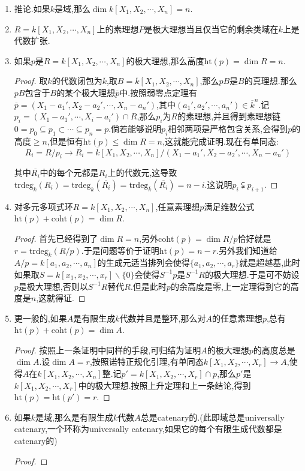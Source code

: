 \begin{enumerate}
	\item 推论.如果$k$是域,那么$\dim k[X_1,X_2,\cdots,X_n]=n$.
	\item $R=k[X_1,X_2,\cdots,X_n]$上的素理想$P$是极大理想当且仅当它的剩余类域在$k$上是代数扩张.
	\item 如果$p$是$R=k[X_1,X_2,\cdots,X_n]$的极大理想,那么高度$\mathrm{ht}(p)=\dim R=n$.
	\begin{proof}
		
		取$k$的代数闭包为$\overline{k}$,取$B=\overline{k}[X_1,X_2,\cdots,X_n]$,那么$pB$是$B$的真理想.那么$pB$包含于$B$的某个极大理想$\overline{p}$中.按照弱零点定理有$\overline{p}=(X_1-a_1',X_2-a_2',\cdots,X_n-a_n')$,其中$(a_1',a_2',\cdots,a_n')\in\overline{k}^n$.记$p_i=(X_1-a_1',\cdots,X_i-a_i')\cap R$,那么$p_i$为$R$的素理想,并且得到素理想链$0=p_0\subseteq p_1\subset\cdots\subseteq p_n=p$.倘若能够说明$p_i$相邻两项是严格包含关系,会得到$p$的高度$\ge n$,但是恒有$\mathrm{ht}(p)\le\dim R=n$,这就能完成证明.现在有单同态:
		$$R_i=R/p_i\to\overline{R_i}=\overline{k}[X_1,X_2,\cdots,X_n]/(X_1-a_1',X_2-a_2',\cdots,X_n-a_n')$$
		
		其中$\overline{R_i}$中的每个元都是$R_i$上的代数元,这导致$\mathrm{trdeg}_k(R_i)=\mathrm{trdeg}_k(\overline{R_i})=\mathrm{trdeg}_{\overline{k}}(\overline{R_i})=n-i$.这说明$p_i\subsetneqq p_{i+1}$.
	\end{proof}
	\item 对多元多项式环$R=k[X_1,X_2,\cdots,X_n]$,任意素理想$p$满足维数公式$\mathrm{ht}(p)+\mathrm{coht}(p)=\dim R$.
	\begin{proof}
		
		首先已经得到了$\dim R=n$,另外$\mathrm{coht}(p)=\dim R/p$恰好就是$r=\mathrm{trdeg}_k(R/p)$.于是问题等价于证明$\mathrm{ht}(p)=n-r$.另外我们知道给$A/p=k[a_1,a_2,\cdots,a_n]$的生成元适当排列会使得$\{a_1,a_2,\cdots,a_r\}$就是超越基,此时如果取$S=k[x_1,x_2,\cdots,x_r]\backslash\{0\}$会使得$S^{-1}p$是$S^{-1}R$的极大理想.于是可不妨设$p$是极大理想,否则以$S^{-1}R$替代$R$.但是此时$p$的余高度是零,上一定理得到它的高度是$n$,这就得证.
	\end{proof}
	\item 更一般的,如果$A$是有限生成$k$代数并且是整环,那么对$A$的任意素理想$p$,总有$\mathrm{ht}(p)+\mathrm{coht}(p)=\dim A$.
	\begin{proof}
		
		按照上一条证明中同样的手段,可归结为证明$A$的极大理想$p$的高度总是$\dim A$.设$\dim A=r$,按照诺特正规化引理,有单同态$k[X_1,X_2,\cdots,X_r]\to A$,使得$A$在$k[X_1,X_2,\cdots,X_n]$整.记$p'=k[X_1,X_2,\cdots,X_r]\cap p$,那么$p'$是$k[X_1,X_2,\cdots,X_r]$中的极大理想.按照上升定理和上一条结论,得到$\mathrm{ht}(p)=\mathrm{ht}(p')=r$.
	\end{proof}
	\item 如果$k$是域,那么是有限生成$k$代数$A$总是catenary的.(此即域总是universally catenary,一个环称为universally catenary,如果它的每个有限生成代数都是catenary的)
	\begin{proof}
		

\end{proof}
\end{enumerate}
